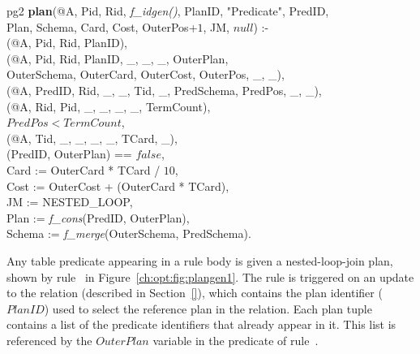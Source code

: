 \begin{figure*}
\ssp
\centering
\begin{boxedminipage}{\linewidth}
\linenumbers
pg2 {\bf plan}(@A, Pid, Rid, {\em f\_idgen()}, PlanID, "Predicate", PredID, \\
\datalogspace \xspace Plan, Schema, Card, Cost, OuterPos+$1$, JM, $null$) :-\\
(@A, Pid, Rid, PlanID),\\
(@A, Pid, Rid, PlanID, \_, \_, \_, OuterPlan, \\
\datalogspace \datalogspace OuterSchema, OuterCard, OuterCost, OuterPos, \_, \_),  \\   
(@A, PredID, Rid, \_, \_, Tid, \_, PredSchema, PredPos, \_, \_),\\
(@A, Rid, Pid, \_, \_, \_, \_, TermCount), \\
\datalogspace $PredPos < TermCount$,\\
(@A, Tid, \_, \_, \_, \_, TCard, \_),\\
(PredID, OuterPlan) == $false$,\\
\datalogspace Card := OuterCard * TCard / $10$,\\
\datalogspace Cost := OuterCost + (OuterCard * TCard),\\
\datalogspace JM := NESTED\_LOOP, \\
\datalogspace Plan := {\em f\_cons}(PredID, OuterPlan), \\
\datalogspace Schema := {\em f\_merge}(OuterSchema, PredSchema).\\
\end{boxedminipage}
\caption{\label{ch:opt:fig:plangen1}nested-loop join method.}
\end{figure*}

Any table predicate appearing in a rule body is given a nested-loop-join plan,
shown by rule~ in Figure~\ref{ch:opt:fig:plangen1}.  The rule is
triggered on an update to the  relation (described in
Section~\ref{}), which contains the plan identifier ($PlanID$) used to select
the reference plan in the  relation.  Each plan tuple contains a list
of the predicate identifiers that already appear in it.  This list is
referenced by the $OuterPlan$ variable in the  predicate of
rule~.

